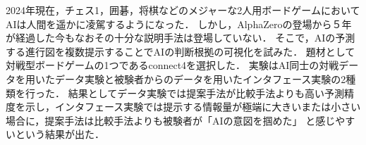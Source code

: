 \abstract
2024年現在，チェス1，囲碁，将棋などのメジャーな2人用ボードゲームにおいてAIは人間を遥かに凌駕するようになった\cite{Nikkei}\cite{deepBlue}\cite{dennou}．
しかし，AlphaZero\cite{AlphaZero}の登場から５年が経過した今もなおその十分な説明手法は登場していない．
そこで，AIの予測する進行図を複数提示することでAIの判断根拠の可視化を試みた．
題材として対戦型ボードゲームの1つであるconnect4\cite{connect4}を選択した．
実験はAI同士の対戦データを用いたデータ実験と被験者からのデータを用いたインタフェース実験の2種類を行った．
結果としてデータ実験では提案手法が比較手法よりも高い予測精度を示し，インタフェース実験では提示する情報量が極端に大きいまたは小さい場合に，提案手法は比較手法よりも被験者が「AIの意図を掴めた」
と感じやすいという結果が出た．